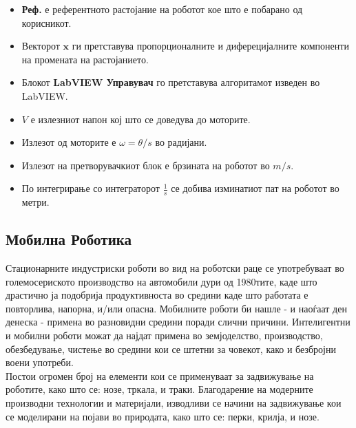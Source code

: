 \documentclass[12pt]{article}
\renewcommand{\vec}[1]{\mathbf{#1}}
\begin{document}
    \begin{itemize}
      \item \textbf{Реф.} е референтното растојание на роботот кое што е побарано од корисникот.
      \item Векторот $\vec{x}$ ги претставува пропорционалните и диферецијалните компоненти на промената на растојанието.
      \item Блокот \textbf{LabVIEW Управувач} го претставува алгоритамот изведен во LabVIEW.
      \item $V$ е излезниот напон кој што се доведува до моторите.
      \item Излезот од моторите е $\omega = \theta/s$ во радијани.
      \item Излезот на претворувачкиот блок е брзината на роботот во $m/s$.
      \item По интегрирање со интеграторот $\frac{1}{s}$ се добива изминатиот пат на роботот во метри.
    \end{itemize}

  \subsection{Мобилна Роботика}
    Стационарните индустриски роботи во вид на роботски раце се употребуваат во големосериското производство на автомобили дури од 1980тите, каде што драстично ја подобрија продуктивноста во средини каде што работата е повторлива, напорна, и/или опасна.
    \bigbreak
    Мобилните роботи би нашле - и наоѓаат ден денеска - примена во разновидни средини поради слични причини. Интелигентни и мобилни роботи можат да најдат примена во земјоделство, производство, обезбедување, чистење во средини кои се штетни за човекот, како и безбројни воени употреби.
    \\ %
    Постои огромен број на елементи кои се применуваат за задвижување на роботите, како што се: нозе, тркала, и траки. Благодарение на модерните производни технологии и материјали, изводливи се начини на задвижување кои се моделирани на појави во природата, како што се: перки, крилја, и нозе.
\end{document}
